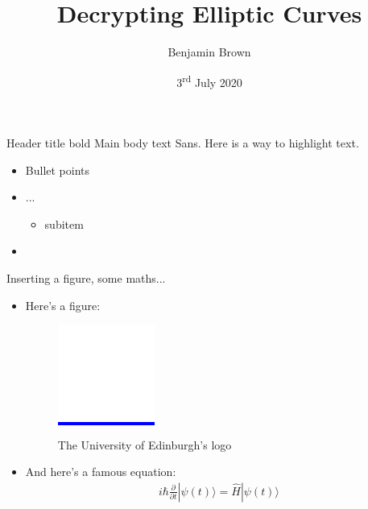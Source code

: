 \documentclass{beamer}
\title[Insert Title (short version of title)]{Decrypting Elliptic Curves}
\author{Benjamin Brown}
\date{3\textsuperscript{rd} July 2020}
\begin{document}
\begin{frame}
  \titlepage
\end{frame}

\begin{frame}[t]{Header title bold}
  Main body text Sans. Here is a way to \alert{highlight text}.
  \label{sec:Test1}
  \begin{itemize}
  \item Bullet points
  \item ...
    \begin{itemize}
    \item subitem
    \end{itemize}
  \item \lipsum[2]
  \end{itemize}
\end{frame}



\begin{frame}{Inserting a figure, some maths...}
  \begin{itemize}
  \item   Here's a figure:
    \begin{figure}[h]
      \centering
      \colorbox{blue}{\includegraphics[width=.13\linewidth]{edinburgh-logo}}
      \caption{The University of Edinburgh's logo}
      \label{fig:edinburgh-logo}
    \end{figure}
  \item 
    And here's a famous equation:
  \begin{eqnarray}
    \label{eq:schroedinger}
    i\hbar {\frac {\partial }{\partial t}}|\psi (t)\rangle ={\hat {H}}|\psi (t)\rangle
  \end{eqnarray}
  \end{itemize}
\end{frame}
\end{document}
